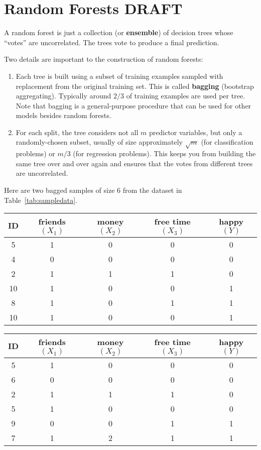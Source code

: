 \chapter{Random Forests {\color{red} DRAFT} \label{chapter:randomforests}}

A random forest is just a collection (or \textbf{ensemble}) of decision trees whose ``votes'' are uncorrelated. The trees vote to produce a final prediction. 

Two details are important to the construction of random forests:
\begin{enumerate} 
\item Each tree is built using a subset of training examples sampled with replacement from the original training set. This is called \textbf{bagging} (bootstrap aggregating). Typically around $2/3$ of training examples are used per tree. Note that bagging is a general-purpose procedure that can be used for other models besides random forests.
\item For each split, the tree considers not all $m$ predictor variables, but only a randomly-chosen subset, usually of size approximately $\sqrt{m}$ (for classification problems) or $m/3$ (for regression problems). This keeps you from building the same tree over and over again and ensures that the votes from different trees are uncorrelated. 
\end{enumerate}

Here are two bagged samples of size $6$ from the dataset in Table~\ref{tab:sampledata}. 

\begin{center}
\begin{tabular}{ccccc}
\toprule
ID & friends $(X_1)$ & money $(X_2)$ & free time $(X_3)$ & happy $(Y)$ \\
\midrule
5 & 1 & 0 & 0 & 0 \\[1mm]
4 & 0 & 0 & 0 & 0 \\[1mm]
2 & 1 & 1 & 1 & 0 \\[1mm]
\midrule
10 & 1 & 0 & 0 & 1 \\[1mm]
8 & 1 & 0 & 1 & 1 \\[1mm]
10 & 1 & 0 & 0 & 1 \\[1mm]
\bottomrule
\end{tabular}
\end{center}

\begin{center}
\begin{tabular}{ccccc}
\toprule
ID & friends $(X_1)$ & money $(X_2)$ & free time $(X_3)$ & happy $(Y)$ \\
\midrule
5 & 1 & 0 & 0 & 0 \\[1mm]
6 & 0 & 0 & 0 & 0 \\[1mm]
2 & 1 & 1 & 1 & 0 \\[1mm]
5 & 1 & 0 & 0 & 0 \\[1mm]
\midrule
9 & 0 & 0 & 1 & 1 \\[1mm]
7 & 1 & 2 & 1 & 1 \\[1mm]
\bottomrule
\end{tabular}
\end{center}

